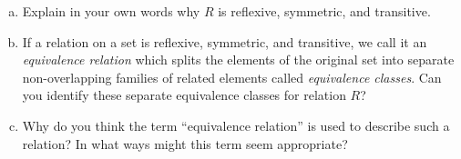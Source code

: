 \documentclass[12pt]{article}
\begin{document}
\begin{enumerate}
\begin{enumerate}[(a)]
			
			\item Explain in your own words why $R$ is reflexive, symmetric, and transitive. 
			
			
			\item If a relation on a set is reflexive, symmetric, and transitive, we call it an \textit{equivalence relation} which splits the elements of the original set into separate non-overlapping families of related elements called \textit{equivalence classes}. Can you identify these separate equivalence classes for relation $R$?
			
			
			\item Why do you think the term ``equivalence relation'' is used to describe such a relation? In what ways might this term seem appropriate?
			
			
		\end{enumerate}
	\end{enumerate}
\end{document}
